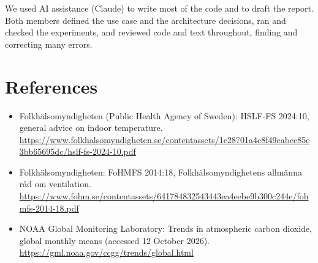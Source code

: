 \documentclass[11pt,a4paper]{article}
\begin{document}
\smallskip\noindent We used AI assistance (Claude) to write most of the code and to draft the report. Both members defined the use case and the architecture decisions, ran and checked the experiments, and reviewed code and text throughout, finding and correcting many errors.

\section*{References}
{\small\begin{itemize}
\item Folkh\"alsomyndigheten (Public Health Agency of Sweden): HSLF-FS 2024:10, general advice on indoor temperature. \url{https://www.folkhalsomyndigheten.se/contentassets/1c28701a4c8f49cabce85e3bb65695dc/hslf-fs-2024-10.pdf}
\item Folkh\"alsomyndigheten: FoHMFS 2014:18, Folkh\"alsomyndighetens allm\"anna r\aa d om ventilation. \url{https://www.fohm.se/contentassets/641784832543443ea4eebe9b300c244e/fohmfs-2014-18.pdf}
\item NOAA Global Monitoring Laboratory: Trends in atmospheric carbon dioxide, global monthly means (accessed 12 October 2026). \url{https://gml.noaa.gov/ccgg/trends/global.html}
\end{itemize}}
\end{document}
